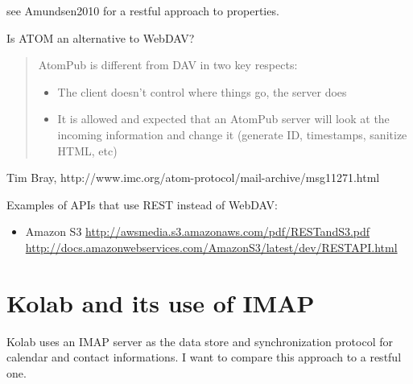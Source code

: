 \documentclass[12pt,a4paper]{scrartcl}		%
\begin{document}
see Amundsen2010 for a restful approach to properties.

Is ATOM an alternative to WebDAV?

\begin{quote}
  AtomPub is different from DAV in two key respects:
  \begin{itemize}
  \item The client doesn't control where things go, the server does
  \item It is allowed and expected that an AtomPub server will look at the incoming information and change it (generate ID, timestamps, sanitize HTML, etc)
  \end{itemize}
\end{quote}
Tim Bray, http://www.imc.org/atom-protocol/mail-archive/msg11271.html



Examples of APIs that use REST instead of WebDAV:
\begin{itemize}
\item Amazon S3 \url{http://awsmedia.s3.amazonaws.com/pdf/RESTandS3.pdf} \url{http://docs.amazonwebservices.com/AmazonS3/latest/dev/RESTAPI.html}

\end{itemize}

\section{Kolab and its use of IMAP}
Kolab uses an IMAP server as the data store and
synchronization protocol for calendar and contact informations. I want to
compare this approach to a restful one.
\end{document}

